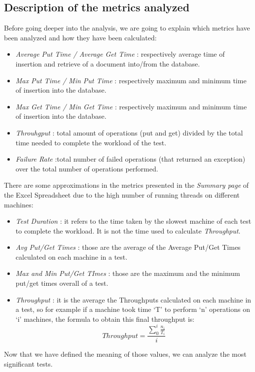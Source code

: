 \subsection{Description of the metrics analyzed}
Before going deeper into the analysis, we are going to explain which metrics have been analyzed and how they have been calculated:
\begin{itemize}
	\item \textit{Average Put Time / Average Get Time} : respectively average time of insertion and retrieve of a document into/from the database.
	\item \textit{Max Put Time / Min Put Time} : respectively maximum and minimum time of insertion into the database.
	\item \textit{Max Get Time / Min Get Time} : respectively maximum and minimum time of insertion into the database.
	\item \textit{Throuhgput} : total amount of operations (put and get) divided by the total time needed to complete the workload of the test.
	\item \textit{Failure Rate} :total number of failed operations (that returned an exception) over the total number of operations performed.
\end{itemize}
There are some approximations in the metrics presented in the \textit{Summary page} of the Excel Spreadsheet due to the high number of running threads on different machines:
\begin{itemize}
	\item \textit{Test Duration} : it refers to the time taken by the slowest machine of each test to complete the workload. It is not the time used to calculate \textit{Throughput}.
	\item \textit{Avg Put/Get Times} : those are the average of the Average Put/Get Times calculated on each machine in a test.
	\item \textit{Max and Min Put/Get TImes} : those are the maximum and the minimum put/get times overall of a test.
	\item \textit{Throughput} : it is the average the Throughputs calculated on each machine in a test, so for example if a machine took time ‘T’ to perform ‘n’ operations on ‘i’ machines, the formula to obtain this final throughput is: 
\[Throughput = \frac{\sum_{0}^{i}\frac{n_{i}}{T_{i}}}{i}\]

\end{itemize}
Now that we have defined the meaning of those values, we can analyze the most significant tests.
